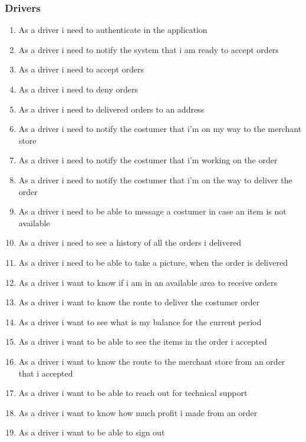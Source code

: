 \subsubsection{Drivers}
\begin{enumerate}[resume, label=USR-\arabic*]
    \item As a driver i need to authenticate in the application
    \item As a driver i need to notify the system that i am ready to 
    accept orders
    \item As a driver i need to accept orders
    \item As a driver i need to deny orders
    \item As a driver i need to delivered orders to an address
    \item As a driver i need to notify the costumer that i’m on my way to the 
    merchant store
    \item As a driver i need to notify the costumer that i’m working on the 
    order
    \item As a driver i need to notify the costumer that i’m on the way to 
    deliver the order
    \item As a driver i need to be able to message a costumer in case an 
    item is not available
    \item As a driver i need to see a history of all the orders i delivered
    \item As a driver i need to be able to take a picture, when the order is 
    delivered
    \item As a driver i want to know if i am in an available area to receive 
    orders
    \item As a driver i want to know the route to deliver the costumer order
    \item As a driver i want to see what is my balance for the current period
    \item As a driver i want to be able to see the items in the order i 
    accepted
    \item As a driver i want to know the route to the merchant store from an 
    order that i accepted
    \item As a driver i want to be able to reach out for technical support
    \item As a driver i want to know how much profit i made from an order
    \item As a driver i want to be able to sign out
\end{enumerate}
\pagebreak
